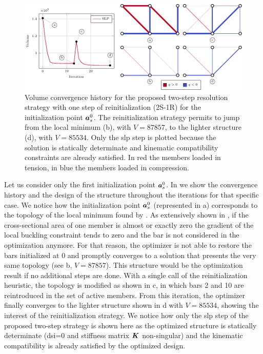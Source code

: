 \begin{figure}
    \centering
    \includegraphics{figures/04_TTO_improvements/10_10_bar_history/10_bar_hist.pdf}
    \caption{Volume convergence history for the proposed two-step resolution strategy with one step of reinitialization (2S-1R) for the initialization point $\bm{a}^0_s$. The reinitialization strategy permits to jump from the local minimum (b), with $V=87857$, to the lighter structure (d), with $V=85534$. Only the \gls{slp} step is plotted because the solution is statically determinate and kinematic compatibility constraints are already satisfied. In red the members loaded in tension, in blue the members loaded in compression.}
    \label{fig:04_10_bar_hist}
\end{figure}

Let us consider only the first initialization point $\bm{a}^0_s$. In  we show the convergence history and the design of the structure throughout the iterations for that specific case. We notice how the initialization point $\bm{a}^0_s$ (represented in a) corresponds to the topology of the local minimum found by \cite{guo_new_2001}. As extensively shown in , if the cross-sectional area of one member is almost or exactly zero the gradient of the local buckling constraint tends to zero and the bar is not considered in the optimization anymore. For that reason, the optimizer is not able to restore the bars initialized at 0 and promptly converges to a solution that presents the very same topology (see b, $V=87857$). This structure would be the optimization result if no additional steps are done. With a single call of the reinitialization heuristic, the topology is modified as shown in c, in which bars 2 and 10 are reintroduced in the set of active members. From this iteration, the optimizer finally converges to the lighter structure shown in d with $V=85534$, showing the interest of the reinitialization strategy. We notice how only the \gls{slp} step of the proposed two-step strategy is shown here as the optimized structure is statically determinate (\gls{dsi}=0 and stiffness matrix $\bm{K}$ non-singular) and the kinematic compatibility is already satisfied by the optimized design.

